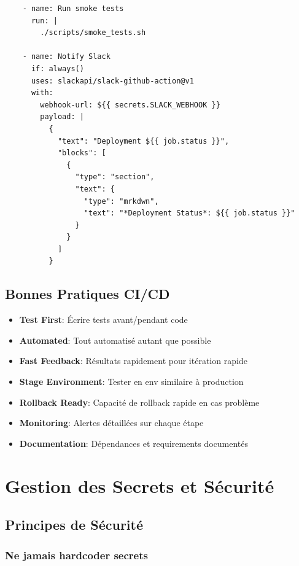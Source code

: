 \documentclass[12pt,a4paper]{report}
\begin{document}
\begin{lstlisting}
    - name: Run smoke tests
      run: |
        ./scripts/smoke_tests.sh
    
    - name: Notify Slack
      if: always()
      uses: slackapi/slack-github-action@v1
      with:
        webhook-url: ${{ secrets.SLACK_WEBHOOK }}
        payload: |
          {
            "text": "Deployment ${{ job.status }}",
            "blocks": [
              {
                "type": "section",
                "text": {
                  "type": "mrkdwn",
                  "text": "*Deployment Status*: ${{ job.status }}"
                }
              }
            ]
          }
\end{lstlisting}

\section{Bonnes Pratiques CI/CD}

\begin{itemize}
    \item \textbf{Test First}: Écrire tests avant/pendant code
    \item \textbf{Automated}: Tout automatisé autant que possible
    \item \textbf{Fast Feedback}: Résultats rapidement pour itération rapide
    \item \textbf{Stage Environment}: Tester en env similaire à production
    \item \textbf{Rollback Ready}: Capacité de rollback rapide en cas problème
    \item \textbf{Monitoring}: Alertes détaillées sur chaque étape
    \item \textbf{Documentation}: Dépendances et requirements documentés
\end{itemize}

\newpage

\chapter{Gestion des Secrets et Sécurité}

\section{Principes de Sécurité}

\subsection{Ne jamais hardcoder secrets}
\end{document}
